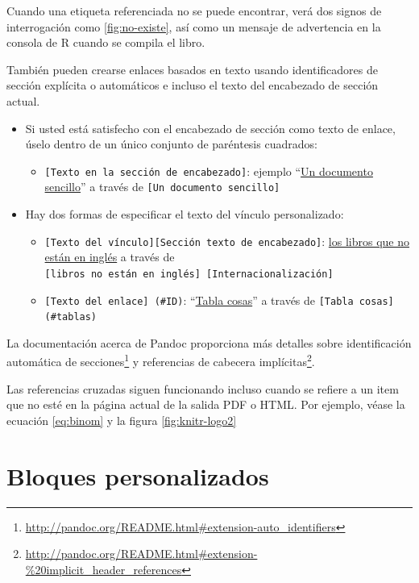 \documentclass[12pt,]{krantz}
\providecommand{\tightlist}{%
  \setlength{\itemsep}{0pt}\setlength{\parskip}{0pt}}
\renewcommand{\href}[2]{#2\footnote{\url{#1}}}
\theoremstyle{definition}
\theoremstyle{definition}
\theoremstyle{remark}
\begin{document}
Cuando una etiqueta referenciada no se puede encontrar, verá dos signos
de interrogación como \ref{fig:no-existe}, así como un mensaje de
advertencia en la consola de R cuando se compila el libro.

También pueden crearse enlaces basados en texto usando identificadores
de sección explícita o automáticos e incluso el texto del encabezado de
sección actual.

\begin{itemize}
\tightlist
\item
  Si usted está satisfecho con el encabezado de sección como texto de
  enlace, úselo dentro de un único conjunto de paréntesis cuadrados:

  \begin{itemize}
  \tightlist
  \item
    \texttt{{[}Texto\ en\ la\ sección\ de\ encabezado{]}}: ejemplo
    ``\protect\hyperlink{un-documento-sencillo}{Un documento sencillo}''
    a través de \texttt{{[}Un\ documento\ sencillo{]}}
  \end{itemize}
\item
  Hay dos formas de especificar el texto del vínculo personalizado:

  \begin{itemize}
  \tightlist
  \item
    \texttt{{[}Texto\ del\ vínculo{]}{[}Sección\ texto\ de\ encabezado{]}}:
    \protect\hyperlink{internacionalizacion}{los libros que no están en
    inglés} a través de
    \texttt{{[}libros\ no\ están\ en\ inglés{]}\ {[}Internacionalización{]}}
  \item
    \texttt{{[}Texto\ del\ enlace{]}\ (\#ID)}:
    ``\protect\hyperlink{tablas}{Tabla cosas}'' a través de
    \texttt{{[}Tabla\ cosas{]}(\#tablas)}
  \end{itemize}
\end{itemize}

La documentación acerca de Pandoc proporciona más detalles sobre
\href{http://pandoc.org/README.html\#extension-auto_identifiers}{identificación
automática de secciones} y
\href{http://pandoc.org/README.html\#extension-\%20implicit_header_references}{referencias
de cabecera implícitas}.

Las referencias cruzadas siguen funcionando incluso cuando se refiere a
un item que no esté en la página actual de la salida PDF o HTML. Por
ejemplo, véase la ecuación \eqref{eq:binom} y la figura
\ref{fig:knitr-logo2}

\section{Bloques personalizados}\label{bloques-personalizados}
\end{document}
